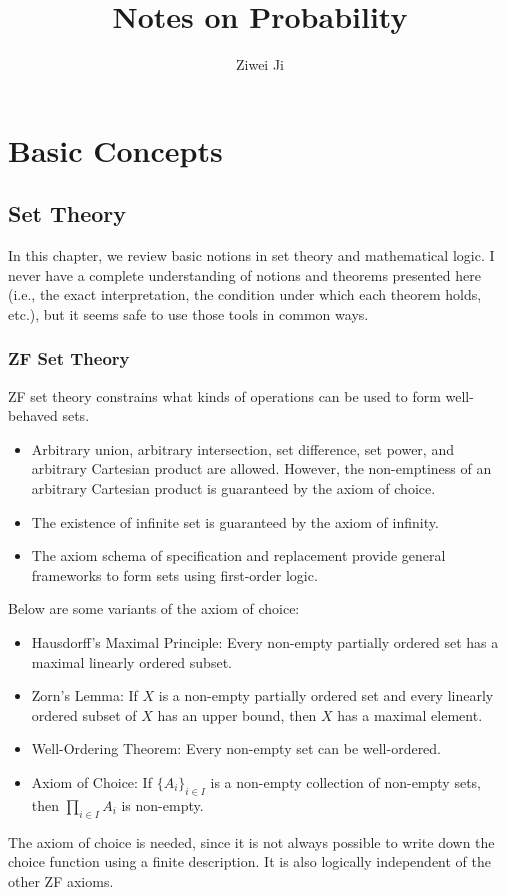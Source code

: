 \documentclass[openany]{book}
\author{Ziwei Ji}
\title{Notes on Probability}
\theoremstyle{definition}
\theoremstyle{remark}
\begin{document}
\maketitle
\tableofcontents

\part{Basic Concepts}
\chapter{Set Theory}
In this chapter, we review basic notions in set theory and mathematical logic. I never have a complete understanding of notions and theorems presented here (i.e., the exact interpretation, the condition under which each theorem holds, etc.), but it seems safe to use those tools in common ways.

\section{ZF Set Theory}
ZF set theory constrains what kinds of operations can be used to form well-behaved sets.
\begin{itemize}
    \item Arbitrary union, arbitrary intersection, set difference, set power, and arbitrary Cartesian product are allowed. However, the non-emptiness of an arbitrary Cartesian product is guaranteed by the axiom of choice.
    \item The existence of infinite set is guaranteed by the axiom of infinity.
    \item The axiom schema of specification and replacement provide general frameworks to form sets using first-order logic.
\end{itemize}

Below are some variants of the axiom of choice:
\begin{itemize}
    \item Hausdorff's Maximal Principle: Every non-empty partially ordered set has a maximal linearly ordered subset.
    \item Zorn's Lemma: If $X$ is a non-empty partially ordered set and every linearly ordered subset of $X$ has an upper bound, then $X$ has a maximal element.
    \item Well-Ordering Theorem: Every non-empty set can be well-ordered.
    \item Axiom of Choice: If $\{A_i\}_{i\in I}$ is a non-empty collection of non-empty sets, then $\prod_{i\in I}A_i$ is non-empty.
\end{itemize}
The axiom of choice is needed, since it is not always possible to write down the choice function using a finite description. It is also logically independent of the other ZF axioms.
\end{document}
